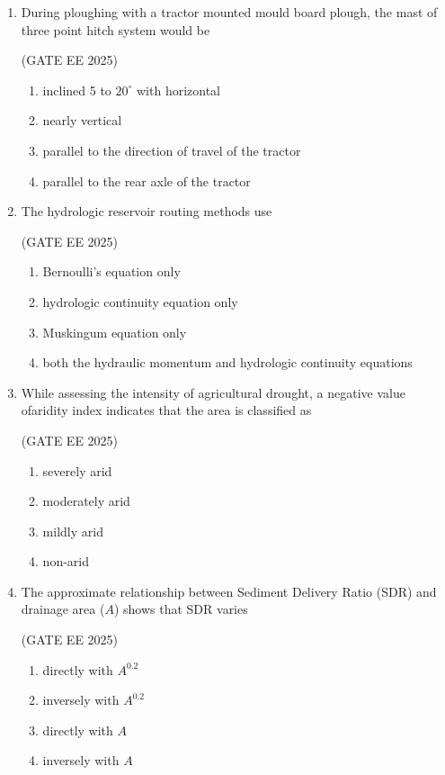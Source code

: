 \documentclass[journal,12pt,onecolumn]{IEEEtran}
\theoremstyle{remark}
\begin{document}
\begin{enumerate}
\item During ploughing with a tractor mounted mould board plough, the mast of
three point hitch system would be

\hfill(GATE EE 2025)

\begin{enumerate}
\item inclined 5 to $20^\circ$ with horizontal
\item nearly vertical
\item parallel to the direction of travel of the tractor
\item parallel to the rear axle of the tractor
\end{enumerate}

\item The hydrologic reservoir routing methods use

\hfill(GATE EE 2025)

\begin{enumerate}
\item Bernoulli's equation only
\item hydrologic continuity equation only
\item Muskingum equation only
\item both the hydraulic momentum and hydrologic continuity equations
\end{enumerate}


\item While assessing the intensity of agricultural drought, a negative value ofaridity index indicates that the area is classified as

\hfill(GATE EE 2025)

\begin{multicols}{4}
\begin{enumerate}
\item severely arid
\item moderately arid
\item mildly arid
\item non-arid
\end{enumerate}
\end{multicols}

\item The approximate relationship between Sediment Delivery Ratio (SDR) and drainage area ($A$) shows that SDR varies

\hfill(GATE EE 2025)

\begin{multicols}{4}
\begin{enumerate}
\item directly with $A^{0.2}$
\item inversely with $A^{0.2}$
\item directly with $A$
\item inversely with $A$
\end{enumerate}
\end{multicols}


\end{enumerate}
\end{document}
